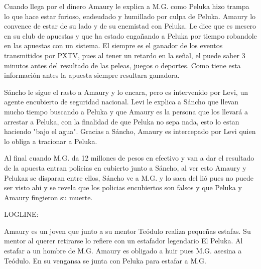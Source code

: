 \documentclass[12pt,letterpaper]{article}
\begin{document}
Cuando llega por el dinero Amaury le explica a M.G. como Peluka hizo trampa lo que hace estar furioso, endeudado y humillado por culpa de Peluka. Amaury lo convence de estar de su lado y de su enemistad con Peluka. Le dice que es mesero en su club de apuestas y que ha estado engañando a Peluka por tiempo robandole en las apuestas con un sistema. El siempre es el ganador de los eventos transmitidos por PXTV, pues al tener un retardo en la señal, el puede saber 3 minutos antes del resultado de las peleas, juegos o deportes. Como tiene esta información antes la apuesta siempre resultara ganadora.

Sáncho le sigue el rasto a Amaury y lo encara, pero es intervenido por Levi, un agente encubierto de seguridad nacional. Levi le explica a Sáncho que llevan mucho tiempo buscando a Peluka y que Amaury es la persona que los llevará a arrestar a Peluka, con la finalidad de que Peluka no sepa nada, esto lo estan haciendo "bajo el agua". Gracias a Sáncho, Amaury es intercepado por Levi quien lo obliga a tracionar a Peluka.

Al final cuando M.G. da 12 millones de pesos en efectivo y van a dar el resultado de la apuesta entran policias en cubierto junto a Sáncho, al ver esto Amaury y Pelukaz se disparan entre ellos, Sáncho ve a M.G. y lo saca del lió pues no puede ser visto ahi y se revela que los policias encubiertos son falsos y que Peluka y Amaury fingieron su muerte.


LOGLINE:

Amaury es un joven que junto a su mentor Teódulo realiza pequeñas estafas. Su mentor al querer retirarse lo refiere con un estafador legendario El Peluka. Al estafar  a un hombre de M.G. Amaury es obligado a huir pues M.G. asesina a Teódulo. En su vengansa se junta con Peluka para estafar a M.G.

\setlength{\parskip}{0pt}
 
\pagebreak
\end{document}
